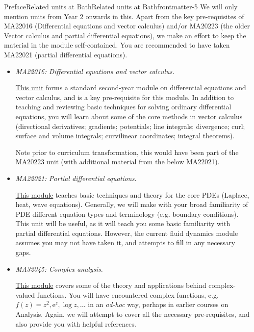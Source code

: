 \documentclass[oneside,10pt,]{book}
\newcommand{\ptxlistdisc}{\raisebox{0.3ex}{\textbullet}}
\newcommand{\ptxlititle}[1]{{\slshape#1}}
\numberwithin{equation}{section}
\newcommand{\e}{\mathrm{e}}
\begin{document}
\begin{preface}{Preface}{Related units at Bath}{}{Related units at Bath}{}{}{frontmatter-5}
We will only mention units from Year 2 onwards in this. Apart from the key pre-requisites of MA22016 (Differential equations and vector calculus) and\slash{}or MA20223 (the older Vector calculus and partial differential equations), we make an effort to keep the material in the module self-contained. You are recommended to have taken MA22021 (partial differential equations).%
\par
%
\begin{itemize}[label=\ptxlistdisc]
\item{}\ptxlititle{MA22016: Differential equations and vector calculus.}\par%
\href{https://www.bath.ac.uk/catalogues/2024-2025/ma/MA22016.html}{This unit} forms a standard second-year module on differential equations and vector calculus, and is a key pre-requisite for this module. In addition to teaching and reviewing basic techniques for solving ordinary differential equations, you will learn about some of the core methods in vector calculus (directional derivatives; gradients; potentials; line integrals; divergence; curl; surface and volume integrals; curvilinear coordinates; integral theorems).%
\par
Note prior to curriculum transformation, this would have been part of the MA20223 unit (with additional material from the below MA22021).%
\item{}\ptxlititle{MA22021: Partial differential equations.}\par%
\href{https://www.bath.ac.uk/catalogues/2024-2025/ma/MA22021.html}{This module} teaches basic techniques and theory for the core PDEs (Laplace, heat, wave equations). Generally, we will make with your broad familiarity of PDE different equation types and terminology (e.g. boundary conditions). This unit will be useful, as it will teach you some basic familiarity with partial differential equations. However, the current fluid dynamics module assumes you may not have taken it, and attempts to fill in any necessary gaps.%
\item{}\ptxlititle{MA32045: Complex analysis.}\par%
\href{https://www.bath.ac.uk/catalogues/2025-2026/ma/MA32045.html}{This module} covers some of the theory and applications behind complex-valued functions. You will have encountered complex functions, e.g. \(f(z) = z^2, \e^z, \log z, \ldots\) in an \emph{ad-hoc} way, perhaps in earlier courses on Analysis. Again, we will attempt to cover all the necessary pre-requisites, and also provide you with helpful references.%
\end{itemize}
%
\end{preface}
\end{document}
